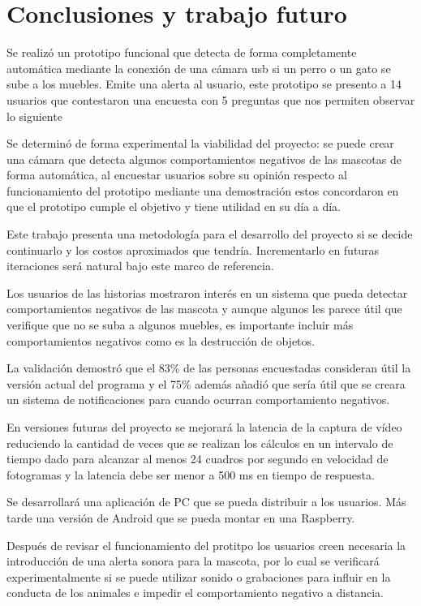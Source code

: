 \section{Conclusiones y trabajo futuro}
\label{sec:conclusiones}

Se realizó un prototipo funcional que detecta de forma completamente automática mediante la conexión de una cámara usb si un perro o un gato se sube a los muebles. Emite una alerta al usuario, este prototipo se presento a 14 usuarios que contestaron una encuesta con 5 preguntas que nos permiten observar lo siguiente

Se determinó de forma experimental la viabilidad del proyecto: se puede crear una cámara que detecta algunos comportamientos negativos de las mascotas de forma automática, al encuestar usuarios sobre su opinión respecto al funcionamiento del prototipo mediante una demostración estos concordaron en que el prototipo cumple el objetivo y tiene utilidad en su día a día.

Este trabajo presenta una metodología para el desarrollo del proyecto si se decide continuarlo y los costos aproximados que tendría. Incrementarlo en futuras iteraciones será natural bajo este marco de referencia.

Los usuarios de las historias mostraron interés en un sistema que pueda detectar comportamientos negativos de las mascota y aunque algunos les parece útil que verifique que no se suba a algunos muebles, es importante incluir más comportamientos negativos como es la destrucción de objetos.

La validación demostró que el 83\% de las personas encuestadas consideran útil la versión actual del programa y el 75\% además añadió que sería útil que se creara un sistema de notificaciones para cuando ocurran comportamiento negativos.

En versiones futuras del proyecto se mejorará la latencia de la captura de vídeo reduciendo la cantidad de veces que se realizan los cálculos en un intervalo de tiempo dado para alcanzar al menos 24 cuadros por segundo en velocidad de fotogramas y la latencia debe ser menor a 500 ms en tiempo de respuesta.

Se desarrollará una aplicación de PC que se pueda distribuir a los usuarios. Más tarde una versión de Android que se pueda montar en una Raspberry.

Después de revisar el funcionamiento del protitpo los usuarios creen necesaria la introducción de una alerta sonora para la mascota, por lo cual se verificará experimentalmente si se puede utilizar sonido o grabaciones para influir en la conducta de los animales e impedir el comportamiento negativo a distancia.

